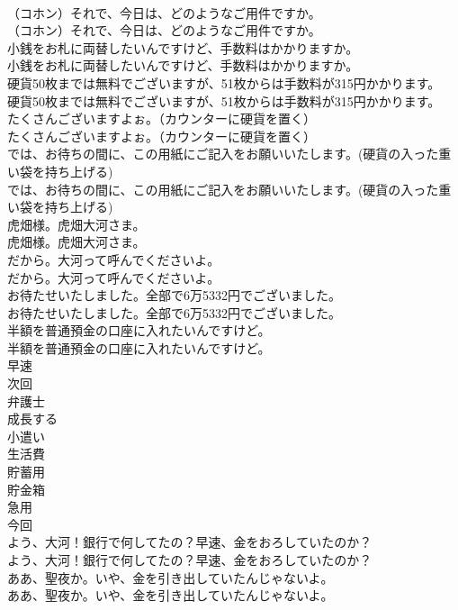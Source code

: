 \documentclass[8pt]{extreport}
\begin{document}
\begin{CJK}{UTF8}{min}
\\	（コホン）それで、今日は、どのようなご用件ですか。	
\\	（コホン）それで、今日は、どのようなご用件ですか。 
\\	小銭をお札に両替したいんですけど、手数料はかかりますか。	
\\	小銭をお札に両替したいんですけど、手数料はかかりますか。 
\\	硬貨50枚までは無料でございますが、51枚からは手数料が315円かかります。	
\\	硬貨50枚までは無料でございますが、51枚からは手数料が315円かかります。 
\\	たくさんございますよぉ。（カウンターに硬貨を置く）	
\\	たくさんございますよぉ。（カウンターに硬貨を置く） 
\\	では、お待ちの間に、この用紙にご記入をお願いいたします。(硬貨の入った重い袋を持ち上げる)	
\\	では、お待ちの間に、この用紙にご記入をお願いいたします。(硬貨の入った重い袋を持ち上げる) 
\\	虎畑様。虎畑大河さま。	
\\	虎畑様。虎畑大河さま。 
\\	だから。大河って呼んでくださいよ。	
\\	だから。大河って呼んでくださいよ。 
\\	お待たせいたしました。全部で6万5332円でございました。	
\\	お待たせいたしました。全部で6万5332円でございました。 
\\	半額を普通預金の口座に入れたいんですけど。	
\\	半額を普通預金の口座に入れたいんですけど。 
\\	早速
\\	次回
\\	弁護士
\\	成長する
\\	小遣い
\\	生活費
\\	貯蓄用
\\	貯金箱
\\	急用
\\	今回
\\	よう、大河！銀行で何してたの？早速、金をおろしていたのか？	
\\	よう、大河！銀行で何してたの？早速、金をおろしていたのか？ 
\\	ああ、聖夜か。いや、金を引き出していたんじゃないよ。	
\\	ああ、聖夜か。いや、金を引き出していたんじゃないよ。 

\end{CJK}
\end{document}
